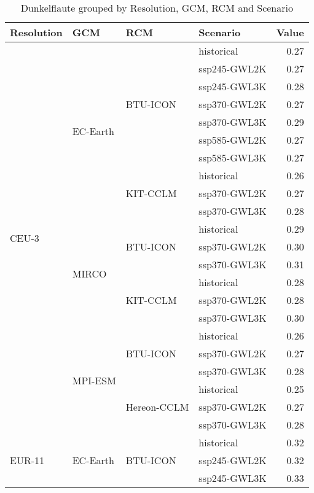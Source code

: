 \begin{table}[!htbp]
\centering
\footnotesize
\caption{Dunkelflaute grouped by Resolution, GCM, RCM and Scenario}
\label{Table:Dunkelflaute_changes}
\begin{tabular}{lll|l|r}
\toprule
Resolution & GCM & RCM & Scenario & Value \\
\midrule
\multirow{22}{*}{CEU-3} & \multirow{10}{*}{EC-Earth} & \multirow{7}{*}{BTU-ICON} & historical & 0.27 \\
 &  &  & ssp245-GWL2K & 0.27 \\
 &  &  & ssp245-GWL3K & 0.28 \\
 &  &  & ssp370-GWL2K & 0.27 \\
 &  &  & ssp370-GWL3K & 0.29 \\
 &  &  & ssp585-GWL2K & 0.27 \\
 &  &  & ssp585-GWL3K & 0.27 \\
\cmidrule(lr){3-5}
 &  & \multirow{3}{*}{KIT-CCLM} & historical & 0.26 \\
 &  &  & ssp370-GWL2K & 0.27 \\
 &  &  & ssp370-GWL3K & 0.28 \\
\cmidrule(lr){3-5}
\cmidrule(lr){2-5}
 & \multirow{6}{*}{MIRCO} & \multirow{3}{*}{BTU-ICON} & historical & 0.29 \\
 &  &  & ssp370-GWL2K & 0.30 \\
 &  &  & ssp370-GWL3K & 0.31 \\
\cmidrule(lr){3-5}
 &  & \multirow{3}{*}{KIT-CCLM} & historical & 0.28 \\
 &  &  & ssp370-GWL2K & 0.28 \\
 &  &  & ssp370-GWL3K & 0.30 \\
\cmidrule(lr){3-5}
\cmidrule(lr){2-5}
 & \multirow{6}{*}{MPI-ESM} & \multirow{3}{*}{BTU-ICON} & historical & 0.26 \\
 &  &  & ssp370-GWL2K & 0.27 \\
 &  &  & ssp370-GWL3K & 0.28 \\
\cmidrule(lr){3-5}
 &  & \multirow{3}{*}{Hereon-CCLM} & historical & 0.25 \\
 &  &  & ssp370-GWL2K & 0.27 \\
 &  &  & ssp370-GWL3K & 0.28 \\
\midrule
\multirow{22}{*}{EUR-11} & \multirow{10}{*}{EC-Earth} & \multirow{7}{*}{BTU-ICON} & historical & 0.32 \\
 &  &  & ssp245-GWL2K & 0.32 \\
 &  &  & ssp245-GWL3K & 0.33 \\

\end{tabular}
\end{table}
